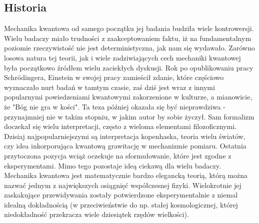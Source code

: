 \documentclass[10pt]{article} %
\begin{document}
\subsection{Historia}
Mechanika kwantowa od samego początku jej badania budziła wiele kontrowersji. Wielu badaczy miało trudności z zaakceptowaniem faktu, iż
na fundamentalnym poziomie rzeczywistość nie jest deterministyczna, jak nam się wydawało. Zarówno losowa natura tej teorii, jak i wiele zadziwiających cech mechaniki kwantowej była początkowo źródłem wielu zaciekłych dyskusji. Rok po opublikowaniu pracy Schrödingera, Einstein w swojej pracy zamieścił zdanie, które częściowo wyznaczało nurt badań w tamtym czasie, zaś dziś jest wraz z innymi popularnymi powiedzeniami kwantowymi zakorzenione w kulturze, a mianowicie, że "Bóg nie gra w kości". Ta teza później okazała się być nieprawdziwa - przynajmniej nie w takim stopniu, w jakim autor by sobie życzył. Sam formalizm doczekał się wielu interpretacji, często z wieloma elementami filozoficznymi. Dzisiaj najpopularniejszymi są interpretacja kopenhaska, teoria wielu światów, czy idea inkorporująca kwantową grawitację w mechanizmie pomiaru. Ostatnia przytoczona pozycja wciąż oczekuje na sformułowanie, które jest zgodne z eksperymentami. Mimo tego pozostaje ideą ciekawą dla wielu badaczy. Mechanika kwantowa jest matematycznie bardzo elegancką teorią, którą można nazwać jednym z największych osiągnięć współczesnej fizyki. Wielokrotnie jej zaskakujące przewidywania zostały potwierdzone eksperymentalnie z niemal idealną dokładnością (w przeciwieństwie do np. stałej kosmologicznej, której niedokładność przekracza wiele dziesiątek rzędów wielkości). 
\end{document}
